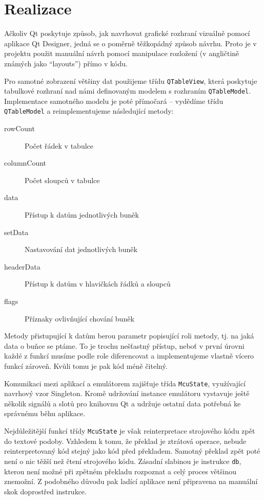 \section{Realizace}

Ačkoliv Qt poskytuje způsob, jak navrhovat grafické rozhraní vizuálně pomocí aplikace Qt Designer\todocite, jedná se o poměrně těžkopádný způsob návrhu. Proto je v projektu použit manuální návrh pomocí manipulace rozložení (v angličtině známých jako ``layouts'') přímo v kódu.

Pro samotné zobrazení většiny dat použijeme třídu \texttt{QTableView}, která poskytuje tabulkové rozhraní nad námi definovaným modelem s rozhraním \texttt{QTableModel}. Implementace samotného modelu je poté přímočará -- vydědíme třídu \texttt{QTableModel} a reimplementujeme následující metody:

\begin{description}
	\item[rowCount] Počet řádek v tabulce
	\item[columnCount] Počet sloupců v tabulce
	\item[data] Přístup k datům jednotlivých buněk
	\item[setData] Nastavování dat jednotlivých buněk
	\item[headerData] Přístup k datům v hlavičkách řádků a sloupců
	\item[flags] Příznaky ovlivňující chování buněk
\end{description}

Metody přistupující k datům berou parametr popisující roli metody, tj. na jaká data o buňce se ptáme. To je trochu nešťastný přístup, neboť v první úrovni každé z funkcí musíme podle role diferencovat a implementujeme vlastně vícero funkcí zároveň. Kvůli tomu je pak kód méně čitelný.


Komunikaci mezi aplikací a emulátorem zajišťuje třída \texttt{McuState}, využívající navrhový vzor Singleton. Kromě udržování instance emulátoru vystavuje ještě několik signálů a slotů pro knihovnu Qt a udržuje ostatní data potřebná ke správnému běhu aplikace.

Nejdůležitější funkcí třídy \texttt{McuState} je však reinterpretace strojového kódu zpět do textové podoby. Vzhledem k tomu, že překlad je ztrátová operace, nebude reinterpretovaný kód stejný jako kód před překladem. Samotný překlad zpět poté není o nic těžší než čtení strojového kódu. Zásadní slabinou je instrukce \texttt{db}, kterou není možné při zpětném překladu rozpoznat a celý proces většinou znemožní. Z podobného důvodu pak ladící aplikace není připravena na manuální skok doprostřed instrukce.

